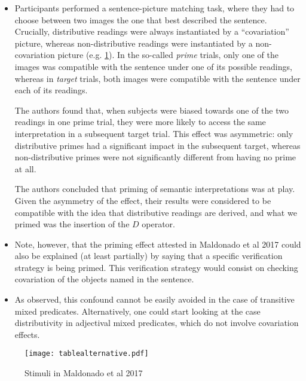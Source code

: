 \documentclass[a4paper]{article}
\newcommand{\nbMM}[1]{{\leavevmode\color{red}{\scriptsize#1}}}
\begin{document}
\begin{itemize}
\item Participants performed a sentence-picture matching task, where they had to choose between two images the one that best described the sentence. Crucially, distributive readings were always instantiated by a ``covariation'' picture, whereas non-distributive readings were instantiated by a non-covariation picture (e.g. \ref{fig:example.maldonado2017}). 
In the so-called \emph{prime} trials, only one of the images was compatible with the sentence under one of its possible readings, whereas in \emph{target} trials, both images were compatible with the sentence under each of its readings. 

\noindent The authors found that, when subjects were biased towards one of the two readings in one prime trial, they were more likely to access the same interpretation in a subsequent target trial. This effect was asymmetric: only distributive primes had a significant impact in the subsequent target, whereas non-distributive primes were not  significantly different from having no prime at all.  \nbMM{Maybe take out the last paragraph. I am unsure of how much information I should give at this point.}

\noindent The authors concluded that priming of semantic interpretations was at play. Given the asymmetry of the effect, their results were considered to be compatible with the idea that distributive readings are derived, and what we primed was the insertion of the $D$ operator.

\item Note, however, that the priming effect attested in Maldonado et al 2017 could also be explained (at least partially) by saying that a specific verification strategy is being primed. This verification strategy would consist on checking covariation of the objects named in the sentence. 

\item As observed, this confound cannot be easily avoided in the case of transitive mixed predicates. Alternatively, one could start looking at the case distributivity in adjectival mixed predicates, which do not involve covariation effects. 
\end{itemize}

\begin{figure}[htbp]
\begin{center}
 \texttt{[image: tablealternative.pdf]}
\caption{Stimuli in Maldonado et al 2017}
\label{fig:example.maldonado2017}
\end{center}
\end{figure}
\end{document}
